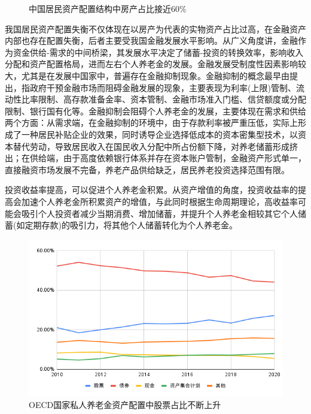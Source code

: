 \documentclass[a4paper,zihao=5]{ctexart}
\begin{document}
\begin{figure}[H]
\begin{minipage}{0.48\linewidth}
        \caption{中国居民资产配置结构中房产占比接近60\%}
    \end{minipage}
\end{figure}

我国居民资产配置失衡不仅体现在以房产为代表的实物资产占比过高，在金融资产内部也存在配置失衡，后者主要受我国金融发展水平影响。从广义角度讲，金融作为资金供给-需求的中间桥梁，其发展水平决定了储蓄-投资的转换效率，影响收入分配和资产配置格局，进而左右个人养老金的发展。金融发展受制度性因素影响较大，尤其是在发展中国家中，普遍存在金融抑制现象。金融抑制的概念最早由\citet{fishkin1973moral}提出，指政府干预金融市场而阻碍金融发展的现象，主要表现为利率(上限)管制、流动性比率限制、高存款准备金率、资本管制、金融市场准入门槛、信贷额度或分配限制、银行国有化等。金融抑制会阻碍个人养老金的发展，主要体现在需求和供给两个方面：从需求端，在金融抑制的环境中，由于存款利率被严重压低，实际上形成了一种居民补贴企业的效果，同时诱导企业选择低成本的资本密集型技术，以资本替代劳动，导致居民收入在国民收入分配中所占份额下降\cite{陈斌开2012金融抑制}，对养老储蓄形成挤出；在供给端，由于高度依赖银行体系并存在资本账户管制，金融资产形式单一，直接融资市场发展不完备，养老产品供给缺乏，居民养老投资选择范围有限。

投资收益率提高，可以促进个人养老金积累。从资产增值的角度，投资收益率的提高会加速个人养老金所积累资产的增值，与此同时根据生命周期理论，高收益率可能会吸引个人投资者减少当期消费、增加储蓄，并提升个人养老金相较其它个人储蓄(如定期存款)的吸引力，将其他个人储蓄转化为个人养老金。
\begin{figure}[H]
    \centering
    \includegraphics[width=\linewidth]{img/OECD国家私人养老金资产配置中股票占比不断上升.png}
    \caption{OECD国家私人养老金资产配置中股票占比不断上升}
\end{figure}
\end{document}
